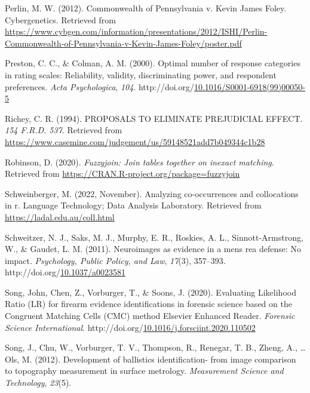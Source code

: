 \documentclass[print]{nuthesis}
\newlength{\cslhangindent}
\newenvironment{CSLReferences}[2]%
{\setlength{\parindent}{0pt}%
\everypar{\setlength{\hangindent}{\cslhangindent}}\ignorespaces}%
{\par}
\begin{document}
\begin{CSLReferences}{1}{0}
\leavevmode{}%
Perlin, M. W. (2012). Commonwealth of {Pennsylvania} v. {Kevin James Foley}. Cybergenetics. Retrieved from \url{https://www.cybgen.com/information/presentations/2012/ISHI/Perlin-Commonwealth-of-Pennsylvania-v-Kevin-James-Foley/poster.pdf}

\leavevmode{}%
Preston, C. C., \& Colman, A. M. (2000). Optimal number of response categories in rating scales: Reliability, validity, discriminating power, and respondent preferences. \emph{Acta Psychologica}, \emph{104}. http://doi.org/\href{https://doi.org/10.1016/S0001-6918(99)00050-5}{10.1016/S0001-6918(99)00050-5}

\leavevmode{}%
Richey, C. R. (1994). PROPOSALS TO ELIMINATE PREJUDICIAL EFFECT. \emph{154 {F}.{R}.{D}. 537}. Retrieved from \url{https://www.casemine.com/judgement/us/59148521add7b049344c1b28}

\leavevmode{}%
Robinson, D. (2020). \emph{Fuzzyjoin: Join tables together on inexact matching}. Retrieved from \url{https://CRAN.R-project.org/package=fuzzyjoin}

\leavevmode{}%
Schweinberger, M. (2022, November). Analyzing co-occurrences and collocations in r. Language Technology; Data Analysis Laboratory. Retrieved from \url{https://ladal.edu.au/coll.html}

\leavevmode{}%
Schweitzer, N. J., Saks, M. J., Murphy, E. R., Roskies, A. L., Sinnott-Armstrong, W., \& Gaudet, L. M. (2011). Neuroimages as evidence in a mens rea defense: {No} impact. \emph{Psychology, Public Policy, and Law}, \emph{17}(3), 357--393. http://doi.org/\href{https://doi.org/10.1037/a0023581}{10.1037/a0023581}

\leavevmode{}%
Song, John, Chen, Z., Vorburger, T., \& Soons, J. (2020). Evaluating {Likelihood} {Ratio} ({LR}) for firearm evidence identifications in forensic science based on the {Congruent} {Matching} {Cells} ({CMC}) method {\textbar} {Elsevier} {Enhanced} {Reader}. \emph{Forensic Science International}. http://doi.org/\href{https://doi.org/10.1016/j.forsciint.2020.110502}{10.1016/j.forsciint.2020.110502}

\leavevmode{}%
Song, J., Chu, W., Vorburger, T. V., Thompson, R., Renegar, T. B., Zheng, A., \ldots{} Ols, M. (2012). Development of ballistics identification- from image comparison to topography measurement in surface metrology. \emph{Measurement Science and Technology}, \emph{23}(5).


\end{CSLReferences}
\end{document}

